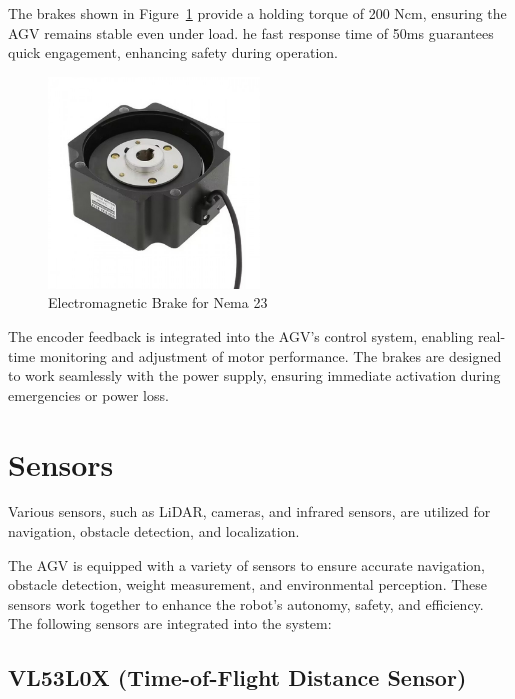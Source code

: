 \documentclass[../../main]{subfiles}
\begin{document}
The brakes shown in Figure~\ref{ Electromagnetic Brake} provide a holding torque of 200 Ncm, ensuring the AGV remains stable even under load. 
he fast response time of 50ms guarantees quick engagement, enhancing safety during operation.

\begin{figure}[H]
    \centering
    \includegraphics[width=0.5\textwidth]{fig/brakes.jpg}
    \caption{ Electromagnetic Brake for Nema 23 }
    \label{ Electromagnetic Brake} %
\end{figure}

The encoder feedback is integrated into the AGV's control system, enabling real-time monitoring and adjustment of motor performance. The brakes are designed to work seamlessly with the power supply, ensuring immediate activation during emergencies or power loss.

\section{Sensors}
Various sensors, such as LiDAR, cameras, and infrared sensors, are utilized for
navigation, obstacle detection, and localization.

The AGV is equipped with a variety of sensors to ensure accurate 
navigation, obstacle detection, weight measurement, and environmental 
perception. These sensors work together to enhance the robot's 
autonomy, safety, and efficiency. The following sensors are integrated 
into the system:

\subsection{VL53L0X (Time-of-Flight Distance Sensor)}
\end{document}

